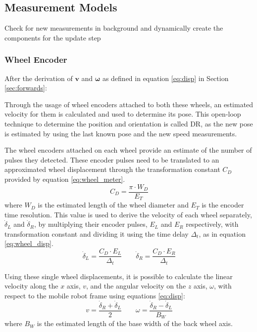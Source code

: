 \subsection{Measurement Models}
\noindent Check for new measurements in background and dynamically create the components for the update step


\subsubsection{Wheel Encoder}

\noindent 
After the derivation of $\mathbf{v}$ and $\boldsymbol \omega$ as defined in equation \ref{eq:disp} in Section \ref{sec:forwards}:

Through the usage of wheel encoders attached to both these wheels, an estimated velocity for them is calculated and used to determine its pose.
This open-loop technique to determine the position and orientation is called \gls{DR}, as the new pose is estimated by using the last known pose and the new speed measurements.

The wheel encoders attached on each wheel provide an estimate of the number of pulses they detected. These encoder pulses need to be translated to an approximated wheel displacement through the transformation constant $C_{D}$ provided by equation \ref{eq:wheel_meter}.
\begin{equation}
C_{D} = \frac{\pi \cdot W_D }{E_T}
\label{eq:wheel_meter}
\end{equation} where $W_D$ is the estimated length of the wheel diameter and $E_T$ is the encoder time resolution.
This value is used to derive the velocity of each wheel separately, $\dot \delta_L$ and $\dot \delta_R$, by multiplying their encoder pulses, $E_L$ and  $E_R$ respectively, with transformation constant and dividing it using the time delay $\Delta_t$, as in equation \ref{eq:wheel_disp}.
\begin{equation}
\dot \delta_{L} = \frac{C_D \cdot E_L}{\Delta_t}  \qquad
\dot \delta_{R} = \frac{C_D \cdot E_R}{\Delta_t}
\label{eq:wheel_disp}
\end{equation}

Using these single wheel displacements, it is possible to calculate the linear velocity along the $x$ axis, $v$, and the angular velocity on the $z$ axis, $\omega$, with respect to the mobile robot frame using equations \ref{eq:disp}:
\begin{equation}
    v =\frac{\dot \delta_{R} + \dot \delta_{L} }{2} \qquad \omega = \frac{\dot \delta _{R} - \dot \delta_{L}}{B_W}
\label{eq:disp}
\end{equation} where $B_W$ is the estimated length of the base width of the back wheel axis.


